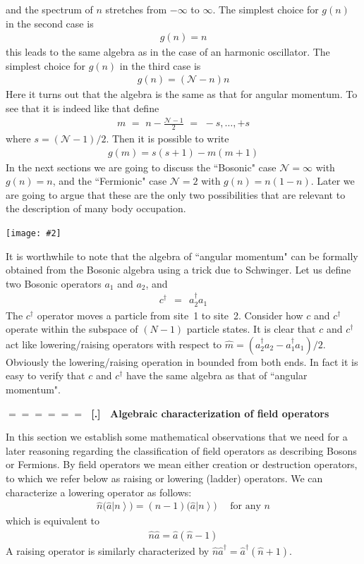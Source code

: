 \documentclass[onecolumn,fleqn]{revtex4}
\newcommand{\putgraph}[2][0.30\hsize]{\texttt{[image: \#2]}}
\newcommand{\beq}{\begin{eqnarray}}
\newcommand{\eeq}{\end{eqnarray}}
\renewcommand{\thesubsection}{\arabic{subsection}}
\renewcommand{\thesubsubsection}{\arabic{subsubsection}}
\newcommand{\sheadC}[1]
{
\addtocounter{subsubsection}{1}
\vspace{5mm}
{\Large\bf $=\!=\!=\!=\!=\!=\;$ [\thesubsection.\thesubsubsection] \ #1}  
\nopagebreak
\phantomsection
}
\begin{document}
and the spectrum of $n$ stretches from $-\infty$ to $\infty$. 
The simplest choice for $g(n)$ in the second case is 
\beq
g(n)=n
\eeq
this leads to the same algebra as in the case of an harmonic 
oscillator.  The simplest choice for $g(n)$ in the third case is 
\beq
g(n)=(\mathcal{N}-n)n
\eeq
Here it turns out that the algebra  
is the same as that for angular momentum. 
To see that it is indeed like that define 
\beq
m \,\,=\,\, n - \frac{\mathcal{N}-1}{2} \,\,=\,\, -s, \dots ,+s
\eeq
where $s=(\mathcal{N}-1)/2$.
Then it is possible to write 
\beq
g(m)  = s(s+1)-m(m+1)  
\eeq
In the next sections we are going to discuss 
the ``Bosonic" case $\mathcal{N}=\infty$ with $g(n)=n$, 
and the ``Fermionic" case $\mathcal{N}=2$ with $g(n)=n(1-n)$. 
Later we are going to argue that these are the 
only two possibilities that are relevant to the 
description of many body occupation. 

\begin{center}
\putgraph[0.55\hsize]{SecondQuantization}
\end{center}


It is worthwhile to note that the algebra of ``angular momentum" 
can be formally obtained from the Bosonic algebra 
using a trick due to Schwinger.  
Let us define two Bosonic operators $a_1$ and $a_2$, and  
\beq
c^{\dag} \ \ = \ \ a_2^{\dag}a_1
\eeq
The $c^{\dag}$ operator moves a particle from site~1 
to site~2. Consider how $c$ and $c^{\dag}$  
operate within the subspace of $(N-1)$ particle states. 
It is clear that $c$ and $c^{\dag}$ act 
like lowering/raising operators with respect 
to $\hat{m} = (a_2^{\dag}a_2 - a_1^{\dag}a_1)/2$.
Obviously the lowering/raising operation in 
bounded from both ends. In fact it is easy 
to verify that $c$ and $c^{\dag}$ have the same 
algebra as that of ``angular momentum".   
 



\sheadC{Algebraic characterization of field operators} 

In this section we establish some 
mathematical observations that we 
need for a later reasoning regarding 
the classification of field operators   
as describing Bosons or Fermions.
By field operators we mean either 
creation or destruction operators, 
to which we refer below 
as raising or lowering (ladder) operators.    
We can characterize a lowering operator as follows:  
\beq
\hat{n}\Big(  \hat{a}\left\vert n\right\rangle \Big)  
=(n-1) \Big(  \hat{a}\left\vert n\right\rangle \Big) 
\ \ \ \ \ \ \mbox{for any $n$} 
\eeq
which is equivalent to  
\beq
\hat{n}\hat{a} = \hat{a}(\hat{n}-1)  
\eeq
A raising operator is similarly 
characterized by ${\hat{n}\hat{a}^{\dag} = \hat{a}^{\dag}(\hat{n}+1)}$.  
\end{document}
